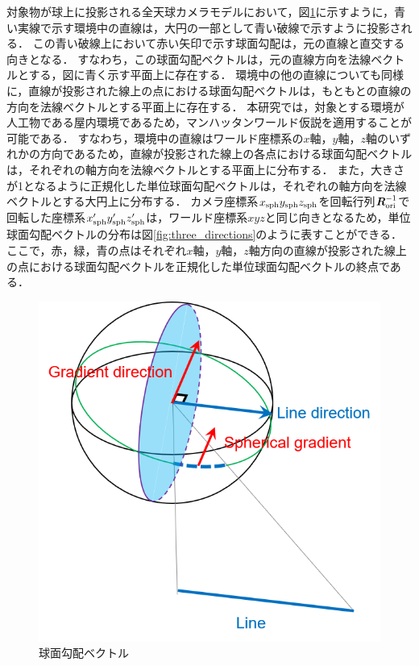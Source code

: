 対象物が球上に投影される全天球カメラモデルにおいて，図\ref{fig:spherical_gradient}に示すように，青い実線で示す環境中の直線は，大円の一部として青い破線で示すように投影される．
この青い破線上において赤い矢印で示す球面勾配は，元の直線と直交する向きとなる．
すなわち，この球面勾配ベクトルは，元の直線方向を法線ベクトルとする，図に青く示す平面上に存在する．
環境中の他の直線についても同様に，直線が投影された線上の点における球面勾配ベクトルは，もともとの直線の方向を法線ベクトルとする平面上に存在する．
本研究では，対象とする環境が人工物である屋内環境であるため，マンハッタンワールド仮説\mbox{\cite{Coughlan2001}}を適用することが可能である．
すなわち，環境中の直線はワールド座標系の$x$軸，$y$軸，$z$軸のいずれかの方向であるため，直線が投影された線上の各点における球面勾配ベクトルは，それぞれの軸方向を法線ベクトルとする平面上に分布する．
また，大きさが1となるように正規化した単位球面勾配ベクトルは，それぞれの軸方向を法線ベクトルとする大円上に分布する．
カメラ座標系$x_{\rm{sph}}y_{\rm{sph}}z_{\rm{sph}}$を回転行列$\bm{R}^{-1}_{\rm{ori}}$で回転した座標系$x'_{\rm{sph}}y'_{\rm{sph}}z'_{\rm{sph}}$は，ワールド座標系$xyz$と同じ向きとなるため，単位球面勾配ベクトルの分布は図\ref{fig:three_directions}のように表すことができる．
ここで，赤，緑，青の点はそれぞれ$x$軸，$y$軸，$z$軸方向の直線が投影された線上の点における球面勾配ベクトルを正規化した単位球面勾配ベクトルの終点である．
\\

\begin{figure}[tb]
 \begin{center}
 \includegraphics[width=0.55\columnwidth]{./chap3/fig/spherical_gradient.png}
 \caption{球面勾配ベクトル}
 \label{fig:spherical_gradient}
 \end{center}
\end{figure}

